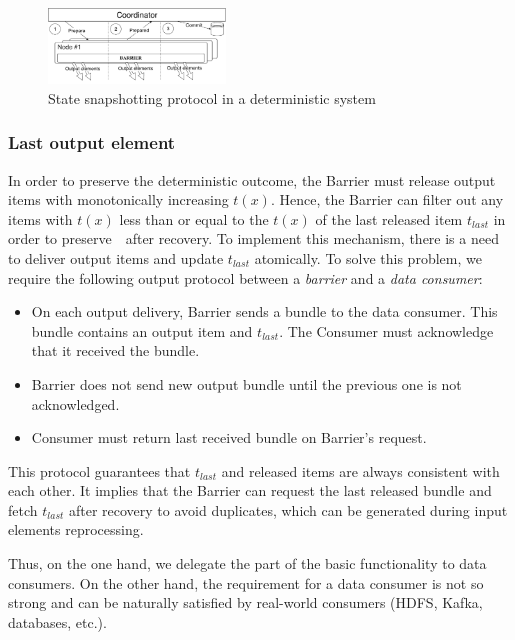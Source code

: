 \begin{figure}[htbp]
  \centering
  \includegraphics[width=0.42\textwidth]{pics/protocol-fs}
  \caption{State snapshotting protocol in a deterministic system}
  \label{protocol_fs}
\end{figure}

\subsubsection{Last output element}

In order to preserve the deterministic outcome, the Barrier must release output items with monotonically increasing $t(x)$. Hence, the Barrier can filter out any items with $t(x)$ less than or equal to the $t(x)$ of the last released item $t_{last}$ in order to preserve~\eo\ after recovery. To implement this mechanism, there is a need to deliver output items and update $t_{last}$ atomically. To solve this problem, we require the following output protocol between a {\em barrier} and a {\em data consumer}: 

\begin{itemize}
    \item On each output delivery, Barrier sends a bundle to the data consumer. This bundle contains an output item and $t_{last}$. The Consumer must acknowledge that it received the bundle.
    \item Barrier does not send new output bundle until the previous one is not acknowledged.
    \item Consumer must return last received bundle on Barrier's request.
\end{itemize}

This protocol guarantees that $t_{last}$ and released items are always consistent with each other. It implies that the Barrier can request the last released bundle and fetch $t_{last}$ after recovery to avoid duplicates, which can be generated during input elements reprocessing.

Thus, on the one hand, we delegate the part of the basic functionality to data consumers. On the other hand, the requirement for a data consumer is not so strong and can be naturally satisfied by real-world consumers (HDFS, Kafka, databases, etc.). 

